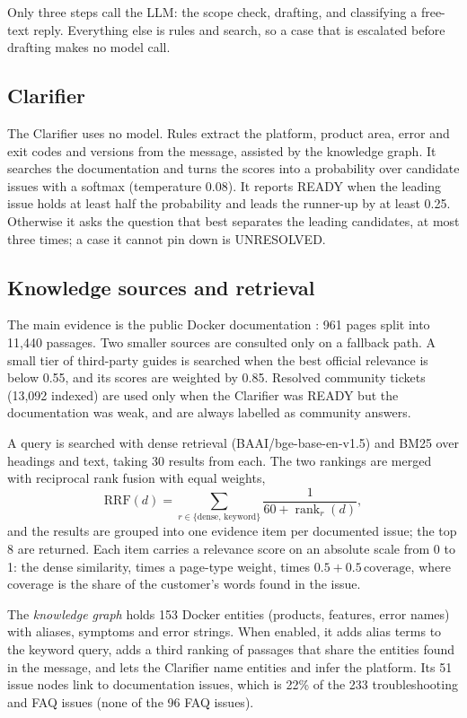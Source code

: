 \documentclass[cameraready]{ieeeconf}
\begin{document}
Only three steps call the LLM: the scope check, drafting, and classifying a free-text reply. Everything else is rules and search, so a case that is escalated before drafting makes no model call.

\subsection{Clarifier}
The Clarifier uses no model. Rules extract the platform, product area, error and exit codes and versions from the message, assisted by the knowledge graph. It searches the documentation and turns the scores into a probability over candidate issues with a softmax (temperature 0.08). It reports READY when the leading issue holds at least half the probability and leads the runner-up by at least 0.25. Otherwise it asks the question that best separates the leading candidates, at most three times; a case it cannot pin down is UNRESOLVED.

\subsection{Knowledge sources and retrieval}
The main evidence is the public Docker documentation \cite{dockerdocs}: 961 pages split into 11,440 passages. Two smaller sources are consulted only on a fallback path. A small tier of third-party guides is searched when the best official relevance is below 0.55, and its scores are weighted by 0.85. Resolved community tickets (13,092 indexed) are used only when the Clarifier was READY but the documentation was weak, and are always labelled as community answers.

A query is searched with dense retrieval (BAAI/bge-base-en-v1.5) and BM25 over headings and text, taking 30 results from each. The two rankings are merged with reciprocal rank fusion with equal weights,
\begin{equation}
\mathrm{RRF}(d)=\sum_{r\in\{\mathrm{dense},\,\mathrm{keyword}\}}\frac{1}{60+\operatorname{rank}_r(d)},
\label{eq:rrf}
\end{equation}
and the results are grouped into one evidence item per documented issue; the top 8 are returned. Each item carries a relevance score on an absolute scale from 0 to 1: the dense similarity, times a page-type weight, times $0.5+0.5\,\mathrm{coverage}$, where coverage is the share of the customer's words found in the issue.

The \emph{knowledge graph} holds 153 Docker entities (products, features, error names) with aliases, symptoms and error strings. When enabled, it adds alias terms to the keyword query, adds a third ranking of passages that share the entities found in the message, and lets the Clarifier name entities and infer the platform. Its 51 issue nodes link to documentation issues, which is 22\% of the 233 troubleshooting and FAQ issues (none of the 96 FAQ issues).
\end{document}
